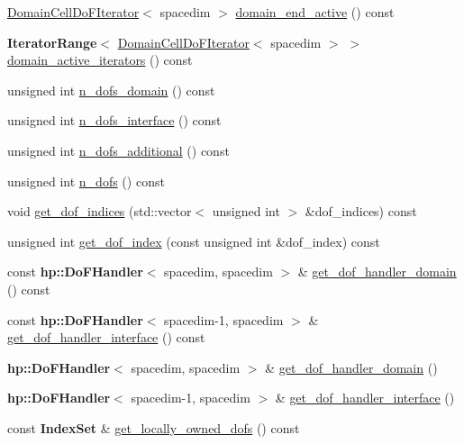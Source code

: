 \begin{DoxyCompactItemize}
\item 
\hyperlink{class_domain_cell_do_f_iterator}{Domain\+Cell\+Do\+F\+Iterator}$<$ spacedim $>$ \hyperlink{class_do_f_handler_system_afb624d9bed38a49be5ebbf16dd2abcd5}{domain\+\_\+end\+\_\+active} () const 
\item 
{\bf Iterator\+Range}$<$ \hyperlink{class_domain_cell_do_f_iterator}{Domain\+Cell\+Do\+F\+Iterator}$<$ spacedim $>$ $>$ \hyperlink{class_do_f_handler_system_a01759f9734ca7e762685d7c85fc30cad}{domain\+\_\+active\+\_\+iterators} () const 
\item 
unsigned int \hyperlink{class_do_f_handler_system_a69aca46be1a419d4ae3b66d57bed8b8e}{n\+\_\+dofs\+\_\+domain} () const 
\item 
unsigned int \hyperlink{class_do_f_handler_system_ac9edbf2dd12e85e83f9a945bd43065ab}{n\+\_\+dofs\+\_\+interface} () const 
\item 
unsigned int \hyperlink{class_do_f_handler_system_a516048c499fac349be1546daaca38d89}{n\+\_\+dofs\+\_\+additional} () const 
\item 
unsigned int \hyperlink{class_do_f_handler_system_a62460181681846997229c994c9df9a7a}{n\+\_\+dofs} () const 
\item 
void \hyperlink{class_do_f_handler_system_a0934c0d1d8ee44f1d5ad8771716db0e7}{get\+\_\+dof\+\_\+indices} (std\+::vector$<$ unsigned int $>$ \&dof\+\_\+indices) const 
\item 
unsigned int \hyperlink{class_do_f_handler_system_a3b13d23ab9e956c71529f415a9dbcd09}{get\+\_\+dof\+\_\+index} (const unsigned int \&dof\+\_\+index) const 
\item 
const {\bf hp\+::\+Do\+F\+Handler}$<$ spacedim, spacedim $>$ \& \hyperlink{class_do_f_handler_system_aa57297d063cb453c85d4c1135d0847b0}{get\+\_\+dof\+\_\+handler\+\_\+domain} () const 
\item 
const {\bf hp\+::\+Do\+F\+Handler}$<$ spacedim-\/1, spacedim $>$ \& \hyperlink{class_do_f_handler_system_a445c8ac85aada74eb741dd5a07d9a231}{get\+\_\+dof\+\_\+handler\+\_\+interface} () const 
\item 
{\bf hp\+::\+Do\+F\+Handler}$<$ spacedim, spacedim $>$ \& \hyperlink{class_do_f_handler_system_a47b35524f131eb242ade5a674096be90}{get\+\_\+dof\+\_\+handler\+\_\+domain} ()
\item 
{\bf hp\+::\+Do\+F\+Handler}$<$ spacedim-\/1, spacedim $>$ \& \hyperlink{class_do_f_handler_system_a7e006440056a4a246c2bdf14347c62d9}{get\+\_\+dof\+\_\+handler\+\_\+interface} ()
\item 
const {\bf Index\+Set} \& \hyperlink{class_do_f_handler_system_a4f4bced9fc691a16e97648856b42577d}{get\+\_\+locally\+\_\+owned\+\_\+dofs} () const 

\end{DoxyCompactItemize}
